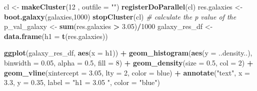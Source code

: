 \documentclass[
]{article}
\newenvironment{Shaded}{\begin{snugshade}}{\end{snugshade}}
\newcommand{\AttributeTok}[1]{\textcolor[rgb]{0.13,0.29,0.53}{#1}}
\newcommand{\CommentTok}[1]{\textcolor[rgb]{0.56,0.35,0.01}{\textit{#1}}}
\newcommand{\DecValTok}[1]{\textcolor[rgb]{0.00,0.00,0.81}{#1}}
\newcommand{\FloatTok}[1]{\textcolor[rgb]{0.00,0.00,0.81}{#1}}
\newcommand{\FunctionTok}[1]{\textcolor[rgb]{0.13,0.29,0.53}{\textbf{#1}}}
\newcommand{\NormalTok}[1]{#1}
\newcommand{\OtherTok}[1]{\textcolor[rgb]{0.56,0.35,0.01}{#1}}
\newcommand{\SpecialCharTok}[1]{\textcolor[rgb]{0.81,0.36,0.00}{\textbf{#1}}}
\newcommand{\StringTok}[1]{\textcolor[rgb]{0.31,0.60,0.02}{#1}}
\begin{document}
\begin{Shaded}
\end{Shaded}

\begin{Shaded}
\begin{Highlighting}[]
\NormalTok{cl }\OtherTok{\textless{}{-}} \FunctionTok{makeCluster}\NormalTok{(}\DecValTok{12}\NormalTok{ , }\AttributeTok{outfile =} \StringTok{""}\NormalTok{)}
\FunctionTok{registerDoParallel}\NormalTok{(cl)}
\NormalTok{res.galaxies }\OtherTok{\textless{}{-}} \FunctionTok{boot.galaxy}\NormalTok{(galaxies,}\DecValTok{1000}\NormalTok{)}
\FunctionTok{stopCluster}\NormalTok{(cl)}
\CommentTok{\# calculate the p value of the }
\NormalTok{p\_val\_galaxy }\OtherTok{\textless{}{-}} \FunctionTok{sum}\NormalTok{(res.galaxies }\SpecialCharTok{\textgreater{}} \FloatTok{3.05}\NormalTok{)}\SpecialCharTok{/}\DecValTok{1000}
\NormalTok{galaxy\_res\_df }\OtherTok{\textless{}{-}} \FunctionTok{data.frame}\NormalTok{(}\AttributeTok{h1 =} \FunctionTok{t}\NormalTok{(res.galaxies))}


\FunctionTok{ggplot}\NormalTok{(galaxy\_res\_df, }\FunctionTok{aes}\NormalTok{(}\AttributeTok{x =}\NormalTok{ h1)) }\SpecialCharTok{+}
    \FunctionTok{geom\_histogram}\NormalTok{(}\FunctionTok{aes}\NormalTok{(}\AttributeTok{y =}\NormalTok{ ..density..), }\AttributeTok{binwidth =} \FloatTok{0.05}\NormalTok{, }\AttributeTok{alpha =} \FloatTok{0.5}\NormalTok{, }\AttributeTok{fill =} \DecValTok{8}\NormalTok{) }\SpecialCharTok{+}
    \FunctionTok{geom\_density}\NormalTok{(}\AttributeTok{size =} \FloatTok{0.5}\NormalTok{, }\AttributeTok{col =} \DecValTok{2}\NormalTok{) }\SpecialCharTok{+}
    \FunctionTok{geom\_vline}\NormalTok{(}\AttributeTok{xintercept =} \FloatTok{3.05}\NormalTok{, }\AttributeTok{lty =} \DecValTok{2}\NormalTok{, }\AttributeTok{color =} \StringTok{\textquotesingle{}blue\textquotesingle{}}\NormalTok{) }\SpecialCharTok{+} 
    \FunctionTok{annotate}\NormalTok{(}\StringTok{"text"}\NormalTok{, }\AttributeTok{x =} \FloatTok{3.3}\NormalTok{, }\AttributeTok{y =} \FloatTok{0.35}\NormalTok{, }\AttributeTok{label =} \StringTok{"h1 = 3.05 "}\NormalTok{, }\AttributeTok{color =} \StringTok{"blue"}\NormalTok{) }
\end{Highlighting}
\end{Shaded}
\end{document}
